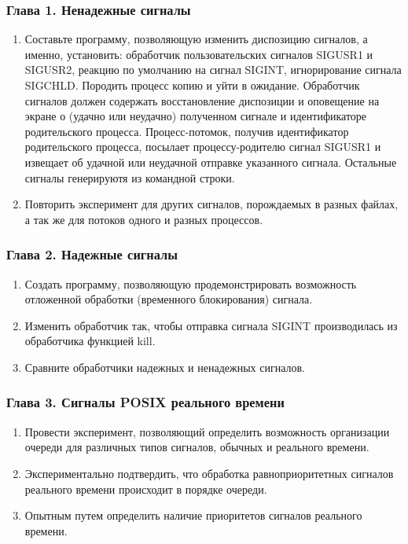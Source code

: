 \documentclass[14pt,a4paper,report]{report}
\begin{document}
\subsubsection{Глава 1. Ненадежные сигналы}

\begin{enumerate}
	\item Составьте программу, позволяющую изменить диспозицию сигналов, а именно, установить: обработчик пользовательских сигналов SIGUSR1 и SIGUSR2, реакцию по умолчанию на сигнал SIGINT, игнорирование сигнала SIGCHLD. Породить процесс копию и уйти в ожидание. Обработчик сигналов должен содержать восстановление диспозиции и оповещение на экране о (удачно или неудачно) полученном сигнале и идентификаторе родительского процесса. Процесс-потомок, получив идентификатор родительского процесса, посылает процессу-родителю сигнал SIGUSR1 и извещает об удачной или неудачной отправке указанного сигнала. Остальные сигналы генерируютя из командной строки.
	\item Повторить эксперимент для других сигналов, порождаемых в разных файлах, а так же для потоков одного и разных процессов. 
\end{enumerate}

\subsubsection{Глава 2. Надежные сигналы}

\begin{enumerate}
	\item Создать программу, позволяющую продемонстрировать возможность отложенной обработки (временного блокирования) сигнала.
	\item Изменить обработчик так, чтобы отправка сигнала SIGINT производилась из обработчика функцией kill.
	\item Сравните обработчики надежных и ненадежных сигналов.
\end{enumerate}

\subsubsection{Глава 3. Сигналы POSIX реального времени}

\begin{enumerate}
	\item Провести эксперимент, позволяющий определить возможность организации очереди для различных типов сигналов, обычных и реального времени.
	\item Экспериментально подтвердить, что обработка равноприоритетных сигналов реального времени происходит в порядке очереди.
	\item Опытным путем определить наличие приоритетов сигналов реального времени.
\end{enumerate}
\end{document}
